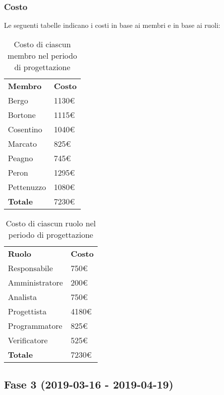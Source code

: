 	\subsubsection{Costo}
		Le seguenti tabelle indicano i costi in base ai membri e in base ai ruoli:	
		\begin{table}[h]
			\centering
			\begin{tabular}{| l | l |}
				\rowcolor{LightBlue}
				\textbf{\color{white}Membro}
				& \textbf{\color{white}Costo}\\
			
				Bergo				& 1130€\\
				Bortone			& 1115€\\
				Cosentino		& 1040€\\
				Marcato			& 825€\\
				Peagno				& 745€\\
				Peron				& 1295€\\
				Pettenuzzo		& 1080€\\ \hline
				\textbf{Totale} & 7230€\\ \hline
			\end{tabular}
			\caption{Costo di ciascun membro nel periodo di progettazione}
		\end{table}
		
		\begin{table}[h]
			\centering
			\begin{tabular}{| l | l |}
				\rowcolor{LightBlue}
				\textbf{\color{white}Ruolo}
				& \textbf{\color{white}Costo}\\
			
				Responsabile 		& 750€\\
				Amministratore 	& 200€\\
				Analista 				& 750€\\			
				Progettista 			& 4180€\\
				Programmatore 		& 825€\\
				Verificatore 		& 525€\\ \hline
				\textbf{Totale} 	& 7230€\\ \hline
			\end{tabular}		
			\caption{Costo di ciascun ruolo nel periodo di progettazione}
		\end{table}
		
\newpage
\subsection{Fase 3 (2019-03-16 - 2019-04-19)}
